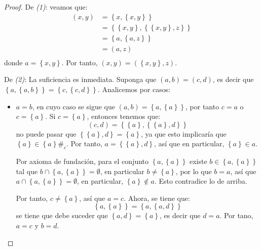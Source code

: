 \documentclass[12pt]{report}
\newcounter{it}
\theoremstyle{largebreak}
\newcommand\contradiction{\ensuremath{\#_c}}
\begin{document}
    \begin{proof}
        De \textit{(1)}: veamos que:
        \begin{equation*}
            \begin{split}
                (x,y)&=\left\{x,\left\{x,y\right\} \right\}\\
                &=\left\{\left\{x,y\right\},\left\{\left\{x,y\right\},z \right\} \right\}\\
                &=\left\{a,\left\{a,z\right\} \right\}\\
                &=(a,z)\\
            \end{split}
        \end{equation*}
        donde $a=\left\{x,y\right\}$. Por tanto, $(x,y)=(\left\{x,y \right\},z)$.

        De \textit{(2)}: La suficiencia es inmediata. Suponga que $(a,b)=(c,d)$, es decir que $\left\{a,\left\{a,b\right\}\right\}=\left\{c,\left\{c,d\right\}\right\}$. Analicemos por casos:
        \begin{itemize}
            \item $a=b$, en cuyo caso se sigue que $(a,b)=\left\{a,\left\{a\right\}\right\}$, por tanto $c=a$ o $c=\left\{a\right\}$. Si $c=\left\{a\right\}$, entonces tenemos que:
            \begin{equation*}
                (c,d)=\left\{\left\{a\right\},\left\{\left\{a\right\},d\right\} \right\}
            \end{equation*}
            no puede pasar que $\left\{\left\{a\right\},d\right\}=\left\{a\right\}$, ya que esto implicaría que $\left\{a\right\}\in\left\{a\right\}$\contradiction. Por tanto, $a=\left\{\left\{a\right\},d \right\}$, así que en particular, $\left\{a\right\}\in a$.

            Por axioma de fundación, para el conjunto $\left\{a,\left\{a\right\} \right\}$ existe $b\in\left\{a,\left\{a\right\} \right\}$ tal que $b\cap\left\{a,\left\{a\right\} \right\}=\emptyset$, en particular $b\neq\left\{a\right\}$, por lo que $b=a$, así que $a\cap\left\{a,\left\{a\right\}\right\}=\emptyset$, en particular, $\left\{a\right\}\notin a$. Esto contradice lo de arriba.

            Por tanto, $c\neq\left\{a\right\}$, así que $a=c$. Ahora, se tiene que:
            \begin{equation*}
                \left\{a,\left\{a\right\} \right\}=\left\{a,\left\{a,d\right\} \right\}
            \end{equation*}
            se tiene que debe suceder que $\left\{a,d \right\}=\left\{a\right\}$, es decir que $d=a$. Por tano, $a=c$ y $b=d$.


\end{itemize}
\end{proof}
\end{document}
